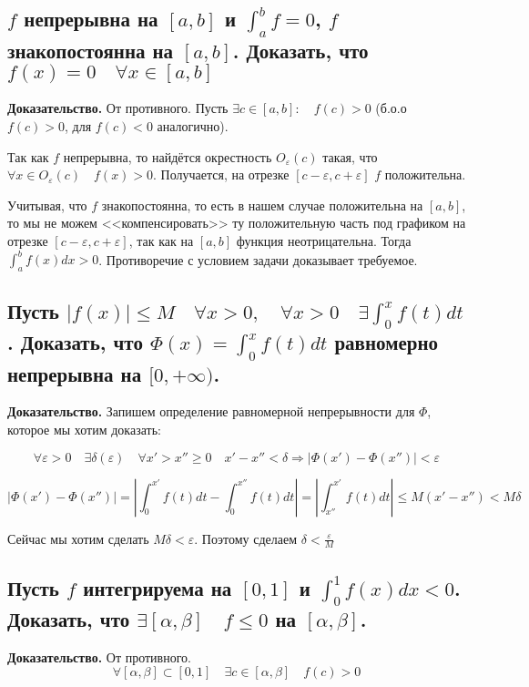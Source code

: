 \documentclass[a4paper]{article}
\begin{document}
\subsection{$f$ непрерывна на $[a,b]$ и $\int_a^b f = 0$, $f$ знакопостоянна на $[a,b]$. Доказать, что $f(x)=0 \quad \forall x \in [a,b]$}

\textbf{Доказательство.} От противного. Пусть $\exists c \in [a,b]: \quad f(c)>0$ (б.о.о $f(c)>0$, для $f(c) < 0$ аналогично).

Так как $f$ непрерывна, то найдётся окрестность $O_{\varepsilon}(c)$ такая, что $\forall x \in O_{\varepsilon}(c) \quad f(x) > 0$. Получается, на отрезке $[c-\varepsilon, c+\varepsilon]$ $f$ положительна. 

Учитывая, что $f$ знакопостоянна, то есть в нашем случае положительна на $[a,b]$, то мы не можем <<компенсировать>> ту положительную часть под графиком на отрезке $[c-\varepsilon, c+\varepsilon]$, так как на $[a,b]$ функция неотрицательна. Тогда $\int_a^b f(x)dx > 0$. Противоречие с условием задачи доказывает требуемое.

\subsection{Пусть $|f(x)| \leq M \quad \forall x > 0, \quad \forall x > 0 \quad \exists \int_0^x f(t)dt$. Доказать, что $\Phi(x) = \int_0^x f(t)dt$ равномерно непрерывна на $[0, +\infty)$.}

\textbf{Доказательство.}
Запишем определение равномерной непрерывности для $\Phi$, которое мы хотим доказать:

\[
\forall \varepsilon > 0 \quad \exists \delta(\varepsilon) \quad \forall x' > x'' \geq 0 \quad x'-x''<\delta \Rightarrow |\Phi(x') - \Phi(x'')| < \varepsilon
\]

\[
|\Phi(x') - \Phi(x'')| = \left| \int_0^{x'} f(t)dt - \int_0^{x''} f(t)dt \right| = \left| \int_{x''}^{x'} f(t)dt \right| \leq M(x'-x'') < M\delta 
\]

Сейчас мы хотим сделать $M\delta < \varepsilon$. Поэтому сделаем $\delta < \frac{\varepsilon}{M}$

\subsection{Пусть $f$ интегрируема на $[0,1]$ и $\int_0^1 f(x)dx < 0$. Доказать, что $\exists [\alpha, \beta] \quad f \leq 0$ на $[\alpha, \beta]$.}

\textbf{Доказательство.} От противного. 
\[ \forall [\alpha, \beta] \subset [0,1] \quad \exists c \in [\alpha, \beta] \quad f(c) > 0\]
\end{document}
